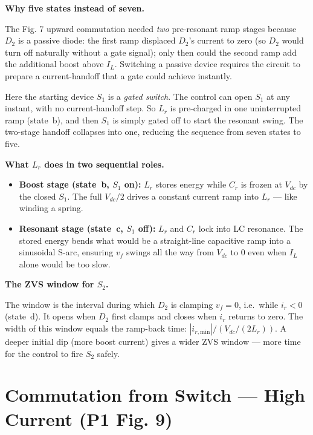 \documentclass[12pt, a4paper]{article}
\def\,{ }%
\newcommand{\Vdc}{V_{dc}}
\newcommand{\vf}{v_f}
\newcommand{\ir}{i_r}
\newcommand{\IL}{I_L}
\newcommand{\Lr}{L_r}
\begin{document}
\begin{physbox}[Physical Interpretation --- P1 Fig.\,8]
\textbf{Why five states instead of seven.}

The Fig.\,7 upward commutation needed \emph{two} pre-resonant ramp stages
because $D_2$ is a passive diode: the first ramp displaced $D_2$'s current
to zero (so $D_2$ would turn off naturally without a gate signal); only then
could the second ramp add the additional boost above $\IL$.
Switching a passive device requires the circuit to prepare a current-handoff
that a gate could achieve instantly.

Here the starting device $S_1$ is a \emph{gated switch}.
The control can open $S_1$ at any instant, with no current-handoff step.
So $\Lr$ is pre-charged in one uninterrupted ramp (state~b), and then $S_1$
is simply gated off to start the resonant swing.
The two-stage handoff collapses into one, reducing the sequence from seven
states to five.

\medskip
\textbf{What $\Lr$ does in two sequential roles.}

\begin{itemize}
    \item \textbf{Boost stage (state~b, $S_1$ on):} $\Lr$ stores energy while
          $C_r$ is frozen at $\Vdc$ by the closed $S_1$.
          The full $\Vdc/2$ drives a constant current ramp into $\Lr$ ---
          like winding a spring.
    \item \textbf{Resonant stage (state~c, $S_1$ off):} $\Lr$ and $C_r$ lock
          into LC resonance.
          The stored energy bends what would be a straight-line capacitive
          ramp into a sinusoidal S-arc, ensuring $\vf$ swings all the way
          from $\Vdc$ to $0$ even when $\IL$ alone would be too slow.
\end{itemize}

\medskip
\textbf{The ZVS window for $S_2$.}

The window is the interval during which $D_2$ is clamping $\vf = 0$,
i.e.\ while $\ir < 0$ (state~d).
It opens when $D_2$ first clamps and closes when $\ir$ returns to zero.
The width of this window equals the ramp-back time:
$|i_{r,\text{min}}| / (\Vdc/(2\Lr))$.
A deeper initial dip (more boost current) gives a wider ZVS window ---
more time for the control to fire $S_2$ safely.
\end{physbox}

\section{Commutation from Switch --- High Current (P1 Fig.\,9)}
\label{sec:P1Fig9}
\end{document}
